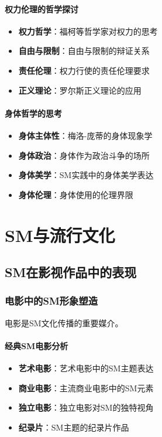 \documentclass[12pt,UTF8]{ctexbook}
\begin{document}
\subsection{权力伦理的哲学探讨}
\begin{itemize}[leftmargin=2cm]
	\item \textbf{权力哲学}：福柯等哲学家对权力的思考
	\item \textbf{自由与限制}：自由与限制的辩证关系
	\item \textbf{责任伦理}：权力行使的责任伦理要求
	\item \textbf{正义理论}：罗尔斯正义理论的应用
\end{itemize}

\subsection{身体哲学的思考}
\begin{itemize}[leftmargin=2cm]
	\item \textbf{身体主体性}：梅洛-庞蒂的身体现象学
	\item \textbf{身体政治}：身体作为政治斗争的场所
	\item \textbf{身体美学}：SM实践中的身体美学表达
	\item \textbf{身体伦理}：身体使用的伦理界限
\end{itemize}

\part{SM与流行文化}

\chapter{SM在影视作品中的表现}
\section{电影中的SM形象塑造}
电影是SM文化传播的重要媒介。

\subsection{经典SM电影分析}
\begin{itemize}[leftmargin=2cm]
	\item \textbf{艺术电影}：艺术电影中的SM主题表达
	\item \textbf{商业电影}：主流商业电影中的SM元素
	\item \textbf{独立电影}：独立电影对SM的独特视角
	\item \textbf{纪录片}：SM主题的纪录片作品
\end{itemize}
\end{document}
